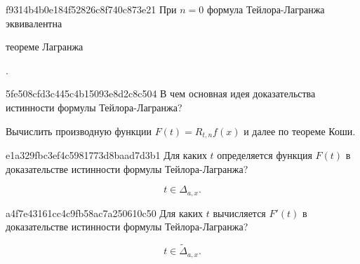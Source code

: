 
\begin{note}{f9314b4b0e184f52826c8f740c873e21}
    При \( n = 0 \) формула Тейлора-Лагранжа эквивалентна \begin{icloze}{1}теореме Лагранжа\end{icloze}.
\end{note}

\begin{note}{5fe508cfd3c445c4b15093e8d2c8c504}
    В чем основная идея доказательства истинности формулы Тейлора-Лагранжа?

    \begin{cloze}{1}
        Вычислить производную функции \( F(t) = R_{t, n} f(x) \) и далее по теореме Коши.
    \end{cloze}
\end{note}

\begin{note}{e1a329fbc3ef4c5981773d8baad7d3b1}
    Для каких \( t \) определяется функция \( F(t) \) в доказательстве истинности формулы Тейлора-Лагранжа?

    \begin{cloze}{1}
        \[
            t \in \Delta _{a, x}.
        \]
    \end{cloze}
\end{note}

\begin{note}{a4f7e43161cc4c9fb58ac7a250610c50}
    Для каких \( t \) вычисляется \( F'(t) \) в доказательстве истинности формулы Тейлора-Лагранжа?

    \begin{cloze}{1}
        \[
            t \in \widetilde \Delta _{a, x}.
        \]
    \end{cloze}
\end{note}

